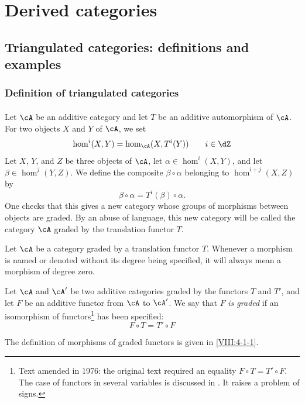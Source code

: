 
\chapter{Derived categories}\label{VIII}

\section{Triangulated categories: definitions and examples}\label{VIII:1}

\subsection{Definition of triangulated categories}\label{VIII:1-1}

\addtocounter{subsubsection}{-1}
\subsubsection{}\label{VIII:1-1-0}

Let $\cA$ be an additive category and let $T$ be an additive automorphism of
$\cA$. For two objects $X$ and $Y$ of $\cA$, we set
\[
  \hom^i(X,Y) = \hom_\cA(X,T^i(Y)) \qquad i\in \dZ
\]
Let $X$, $Y$, and $Z$ be three objects of $\cA$, let
$\alpha\in \hom^i(X,Y)$, and let $\beta\in \hom^j(Y,Z)$. We define the
composite $\beta\circ\alpha$ belonging to $\hom^{i+j}(X,Z)$ by
\[
  \beta\circ \alpha = T^i(\beta)\circ\alpha \text{.}
\]
One checks that this gives a new category whose groups of morphisms between
objects are graded. By an abuse of language, this new category will be called
the category $\cA$ graded by the translation functor $T$.

Let $\cA$ be a category graded by a translation functor $T$. Whenever a
morphism is named or denoted without its degree being specified, it will
always mean a morphism of degree zero.

Let $\cA$ and $\cA'$ be two additive categories graded by the functors $T$
and $T'$, and let $F$ be an additive functor from $\cA$ to $\cA'$. We say
that $F$ \emph{is graded} if an isomorphism of
functors\footnote{Text amended in 1976: the original text required an
equality $F\circ T=T'\circ F$. The case of functors in several variables is
discussed in \cite[XVIII 0.2]{sga4}. It raises a problem of signs.}
has been specified:
\[
  F\circ T = T'\circ F
\]

The definition of morphisms of graded functors is given in
\ref{VIII:4-1-1}.

